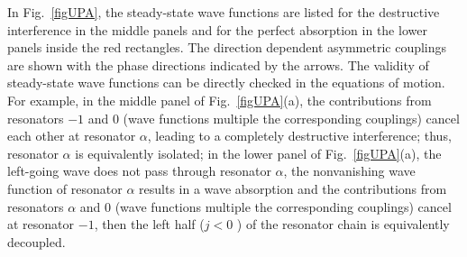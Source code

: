 \documentclass[prl,showpacs,superscriptaddress,twocolumn]{revtex4-1}
\begin{document}
\begin{widetext}
In Fig.~\ref{figUPA}, the steady-state wave functions are
listed for the destructive interference in the middle panels and for the
perfect absorption in the lower panels inside the red rectangles. The
direction dependent asymmetric couplings are shown with the phase directions
indicated by the arrows. The validity of steady-state wave functions can be
directly checked in the equations of motion. For example, in the middle
panel of Fig.~\ref{figUPA}(a), the contributions from
resonators $-1$ and $0$ (wave functions multiple the corresponding
couplings) cancel each other at resonator $\alpha $, leading to a completely
destructive interference; thus, resonator $\alpha $ is equivalently
isolated; in the lower panel of Fig.~\ref{figUPA}(a), the
left-going wave does not pass through resonator $\alpha $, the nonvanishing
wave function of resonator $\alpha $ results in a wave absorption and the
contributions from resonators $\alpha $ and $0$ (wave functions multiple the
corresponding couplings) cancel at resonator $-1$, then the left half ($j<0$%
) of the resonator chain is equivalently decoupled.


\end{widetext}
\end{document}
